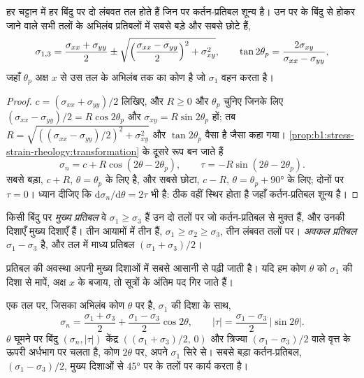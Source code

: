 \begin{theorem}[मुख्य प्रतिबल]
\label{thm:b1:stress-strain-rheology:principal}
हर चट्टान में हर बिंदु पर दो लंबवत तल होते हैं जिन पर कर्तन-प्रतिबल शून्य है। उन पर के  बिंदु से होकर जाने वाले सभी तलों के अभिलंब प्रतिबलों में सबसे बड़े और सबसे छोटे हैं,
\[
  \sigma_{1,3} = \frac{\sigma_{xx}+\sigma_{yy}}{2} \pm
  \sqrt{\Bigl(\frac{\sigma_{xx}-\sigma_{yy}}{2}\Bigr)^2 + \sigma_{xy}^2},
  \qquad \tan2\theta_p = \frac{2\sigma_{xy}}{\sigma_{xx}-\sigma_{yy}},
\]
जहाँ $\theta_p$ अक्ष $x$ से उस तल के अभिलंब तक का कोण है जो $\sigma_1$ वहन करता है।
\end{theorem}

\begin{proof}
$c = (\sigma_{xx}+\sigma_{yy})/2$ लिखिए, और $R \ge 0$ और $\theta_p$ चुनिए जिनके लिए $(\sigma_{xx}-\sigma_{yy})/2 = R\cos2\theta_p$ और $\sigma_{xy} = R\sin2\theta_p$ हों; तब $R = \sqrt{((\sigma_{xx}-\sigma_{yy})/2)^2 + \sigma_{xy}^2}$ और $\tan2\theta_p$ वैसा है जैसा कहा गया। \cref{prop:b1:stress-strain-rheology:transformation} के दूसरे रूप बन जाते हैं
\[
  \sigma_n = c + R\cos(2\theta - 2\theta_p), \qquad \tau = -R\sin(2\theta - 2\theta_p).
\]
 सबसे बड़ा, $c + R$, $\theta = \theta_p$ के लिए है, और सबसे छोटा, $c - R$, $\theta = \theta_p + \ang{90}$ के लिए; दोनों पर $\tau = 0$। ध्यान दीजिए कि $\mathrm d\sigma_n/\mathrm d\theta = 2\tau$ भी है:  ठीक वहीं स्थिर होता है जहाँ कर्तन-प्रतिबल शून्य है।
\end{proof}

\begin{definition}[मुख्य प्रतिबल, अवकल प्रतिबल]
\label{def:b1:stress-strain-rheology:principal}
किसी बिंदु पर \emph{मुख्य प्रतिबल} वे  $\sigma_1 \ge \sigma_3$ हैं उन दो तलों पर जो कर्तन-प्रतिबल से मुक्त हैं, और उनकी दिशाएँ मुख्य दिशाएँ हैं। तीन आयामों में तीन हैं, $\sigma_1 \ge \sigma_2 \ge \sigma_3$, तीन लंबवत तलों पर। \emph{अवकल प्रतिबल} $\sigma_1 - \sigma_3$ है, और तल में माध्य प्रतिबल $(\sigma_1+\sigma_3)/2$।
\end{definition}

प्रतिबल की अवस्था अपनी मुख्य दिशाओं में सबसे आसानी से पढ़ी जाती है। यदि हम कोण $\theta$ को $\sigma_1$ की दिशा से मापें, अक्ष $x$ के बजाय, तो सूत्रों के अंतिम पद गिर जाते हैं।

\begin{proposition}[मोर का वृत्त]
\label{prop:b1:stress-strain-rheology:mohr}
एक तल पर, जिसका अभिलंब कोण $\theta$ पर है, $\sigma_1$ की दिशा के साथ,
\[
  \sigma_n = \frac{\sigma_1+\sigma_3}{2} + \frac{\sigma_1-\sigma_3}{2}\cos2\theta,
  \qquad
  |\tau| = \frac{\sigma_1-\sigma_3}{2}\,|\sin2\theta| .
\]
$\theta$ घूमने पर बिंदु $(\sigma_n, |\tau|)$ केंद्र $((\sigma_1+\sigma_3)/2,\, 0)$ और त्रिज्या $(\sigma_1-\sigma_3)/2$ वाले वृत्त के ऊपरी अर्धभाग पर चलता है, कोण $2\theta$ पर, अपने $\sigma_1$ सिरे से। सबसे बड़ा कर्तन-प्रतिबल, $(\sigma_1-\sigma_3)/2$, मुख्य दिशाओं से \ang{45} पर के तलों पर कार्य करता है।
\end{proposition}

